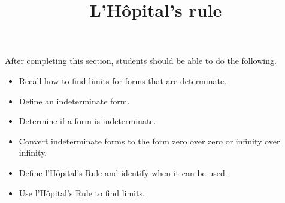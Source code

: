 \documentclass{ximera}
\title{L'H\^{o}pital's rule}
\begin{document}
\begin{abstract}
\end{abstract}

\maketitle

\begin{sectionOutcomes}

After completing this section, students should be able to do the following.

\begin{itemize}
	\item Recall how to find limits for forms that are determinate.
	\item Define an indeterminate form.
	\item Determine if a form is indeterminate.
	\item Convert indeterminate forms to the form zero over zero
          or infinity over infinity.
	\item Define l'H\^{o}pital's Rule and identify when it can be used.
	\item Use l'H\^{o}pital's Rule to find limits.
\end{itemize}

\end{sectionOutcomes}
\end{document}
